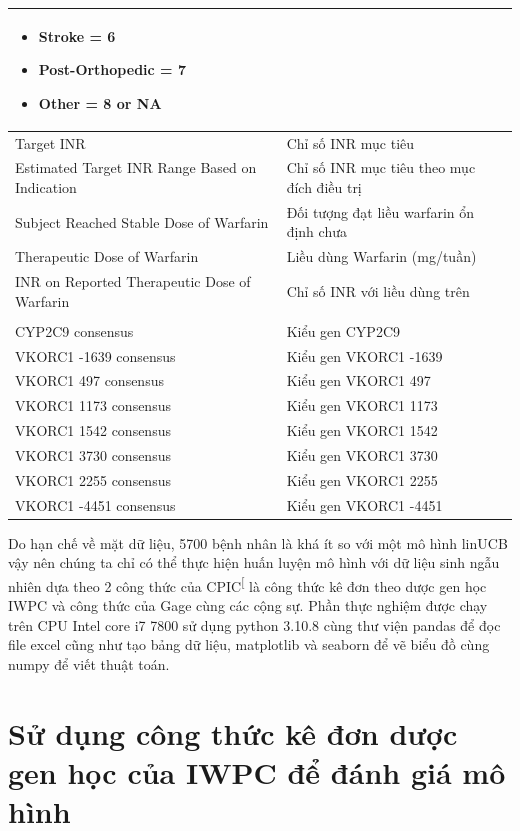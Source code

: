 \documentclass[14pt,oneside]{scrbook}
\begin{document}
\begin{ThreePartTable}
\begin{longtable}[]{|
  >{\raggedright\arraybackslash}p{}|
  >{\raggedright\arraybackslash}p{}|}
\begin{itemize}
            \item Stroke = 6
            \item Post-Orthopedic = 7
            \item Other = 8 or NA
        \end{itemize}
\\ \hline
 Target INR & Chỉ số INR mục tiêu\\ \hline
 Estimated Target INR Range Based on Indication & Chỉ số INR mục tiêu theo mục đích điều trị \\ \hline
 Subject Reached Stable Dose of Warfarin & Đối tượng đạt liều warfarin ổn định chưa \\ \hline
 Therapeutic Dose of Warfarin & Liều dùng Warfarin (mg/tuần)\\ \hline
 INR on Reported Therapeutic Dose of Warfarin & Chỉ số INR với liều dùng trên \\ \hline
\multicolumn{2}{|l|}{\textbf{Các thông tin về nhóm gen dược}} \\ \hline
 CYP2C9 consensus & Kiểu gen CYP2C9 \\ \hline
 VKORC1 -1639 consensus & Kiểu gen VKORC1 -1639 \\ \hline
 VKORC1 497 consensus & Kiểu gen VKORC1 497\\ \hline
 VKORC1 1173 consensus & Kiểu gen VKORC1 1173 \\ \hline
 VKORC1 1542 consensus & Kiểu gen VKORC1 1542 \\ \hline
 VKORC1 3730 consensus & Kiểu gen VKORC1 3730 \\ \hline
 VKORC1 2255 consensus & Kiểu gen VKORC1 2255 \\ \hline
 VKORC1 -4451 consensus & Kiểu gen VKORC1 -4451 \\ \hline
\end{longtable}
\end{ThreePartTable}

Do hạn chế về mặt dữ liệu, 5700 bệnh nhân là khá ít so với một mô hình
linUCB vậy nên chúng ta chỉ có thể thực hiện huấn luyện mô hình với dữ
liệu sinh ngẫu nhiên dựa theo 2 công thức của
CPIC\textsuperscript{{[}\citeproc{ref-cpic}{2}{]}} là công thức kê đơn
theo dược gen học IWPC và công thức của Gage cùng các cộng sự. Phần thực
nghiệm được chạy trên CPU Intel core i7 7800 sử dụng python 3.10.8 cùng
thư viện pandas để đọc file excel cũng như tạo bảng dữ liệu, matplotlib
và seaborn để vẽ biểu đồ cùng numpy để viết thuật toán.

\section{Sử dụng công thức kê đơn dược gen học của IWPC để đánh giá mô
hình}\label{sux1eed-dux1ee5ng-cuxf4ng-thux1ee9c-kuxea-ux111ux1a1n-dux1b0ux1ee3c-gen-hux1ecdc-cux1ee7a-iwpc-ux111ux1ec3-ux111uxe1nh-giuxe1-muxf4-huxecnh}
\end{document}
